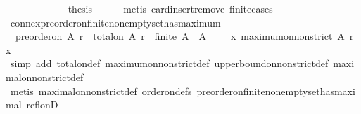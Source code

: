 \begin{isabellebody}
\ \ \ \ \isamarkupfalse%
\isanewline
\ \ \isamarkupfalse%
\isanewline
\ \ \isamarkupfalse%
\ \isamarkupfalse%
\ {\isacharquery}thesis\isanewline
\ \ \ \ \isamarkupfalse%
\ {\isacharparenleft}metis\ card{\isachardot}insert{\isacharunderscore}remove\ finite{\isachardot}cases{\isacharparenright}\isanewline
{}\isamarkupfalse%
%
\endisatagproof
{\isafoldproof}%
%
\isadelimproof
\isanewline
%
\endisadelimproof
\isanewline
\isanewline
{}\isamarkupfalse%
\ connex{\isacharunderscore}preorder{\isacharunderscore}on{\isacharunderscore}finite{\isacharunderscore}non{\isacharunderscore}empty{\isacharunderscore}set{\isacharunderscore}has{\isacharunderscore}maximum\ {\isacharcolon}\isanewline
\ \ {\isachardoublequoteopen}preorder{\isacharunderscore}on\ A\ r\ {\isasymand}\ total{\isacharunderscore}on\ A\ r\ {\isasymlongrightarrow}\ finite\ A\ {\isasymlongrightarrow}\ A\ {\isasymnoteq}\ {\isasymemptyset}\ {\isasymlongrightarrow}\ {\isacharparenleft}{\isasymexists}\ x{\isachardot}\ maximum{\isacharunderscore}on{\isacharunderscore}non{\isacharunderscore}strict\ A\ r\ x{\isacharparenright}{\isachardoublequoteclose}\ \isanewline
%
\isadelimproof
\ \ %
\endisadelimproof
%
\isatagproof
{}\isamarkupfalse%
\ {\isacharparenleft}simp\ add{\isacharcolon}\ total{\isacharunderscore}on{\isacharunderscore}def\ maximum{\isacharunderscore}on{\isacharunderscore}non{\isacharunderscore}strict{\isacharunderscore}def\ upper{\isacharunderscore}bound{\isacharunderscore}on{\isacharunderscore}non{\isacharunderscore}strict{\isacharunderscore}def\ maximal{\isacharunderscore}on{\isacharunderscore}non{\isacharunderscore}strict{\isacharunderscore}def{\isacharparenright}\isanewline
\ \ \isamarkupfalse%
\ {\isacharparenleft}metis\ maximal{\isacharunderscore}on{\isacharunderscore}non{\isacharunderscore}strict{\isacharunderscore}def\ order{\isacharunderscore}on{\isacharunderscore}defs{\isacharparenleft}{}{\isacharparenright}\ preorder{\isacharunderscore}on{\isacharunderscore}finite{\isacharunderscore}non{\isacharunderscore}empty{\isacharunderscore}set{\isacharunderscore}has{\isacharunderscore}maximal\ refl{\isacharunderscore}onD{\isacharparenright}%
\endisatagproof
{\isafoldproof}%
%
\isadelimproof
\ \ \isanewline
%
\endisadelimproof
%
\isadelimtheory
\isanewline
%
\endisadelimtheory
%
\isatagtheory
{}\isamarkupfalse%
%
\endisatagtheory
{\isafoldtheory}%
%
\isadelimtheory
%
\endisadelimtheory
%
\end{isabellebody}%
